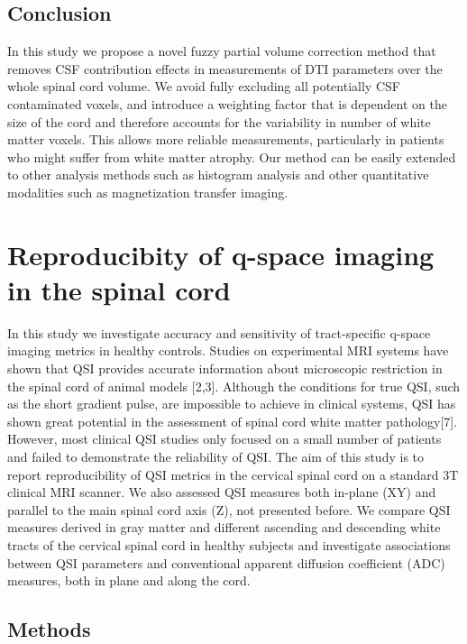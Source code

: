 \subsection*{Conclusion} In this study we propose a novel fuzzy partial volume correction method that removes CSF contribution effects in measurements of DTI parameters over the whole spinal cord volume. We avoid fully excluding all potentially CSF contaminated voxels, and introduce a weighting factor that is dependent on the size of the cord and therefore accounts for the variability in number of white matter voxels. This allows more reliable measurements, particularly in patients who might suffer from white matter atrophy. Our method can be easily extended to other analysis methods such as histogram analysis and other quantitative modalities such as magnetization transfer imaging.

\section{Reproducibity of q-space imaging in the spinal cord} 
In this study we investigate accuracy and sensitivity of tract-specific q-space imaging metrics in healthy controls. Studies on experimental MRI systems have shown that QSI provides accurate information about microscopic restriction in the spinal cord of animal models [2,3]. Although the conditions for true QSI, such as the short gradient pulse, are impossible to achieve in clinical systems, QSI has shown great potential in the assessment of spinal cord white matter pathology[7]. However, most clinical QSI studies only focused on a small number of patients and failed to demonstrate the reliability of QSI. The aim of this study is to report reproducibility of QSI metrics in the cervical spinal cord on a standard 3T clinical MRI scanner. We also assessed QSI measures both in-plane (XY) and parallel to the main spinal cord axis (Z), not presented before. We compare QSI measures derived in gray matter and different ascending and descending white tracts of the cervical spinal cord in healthy subjects and investigate associations between QSI parameters and conventional apparent diffusion coefficient (ADC) measures, both in plane and along the cord. 
\subsection*{Methods} 
